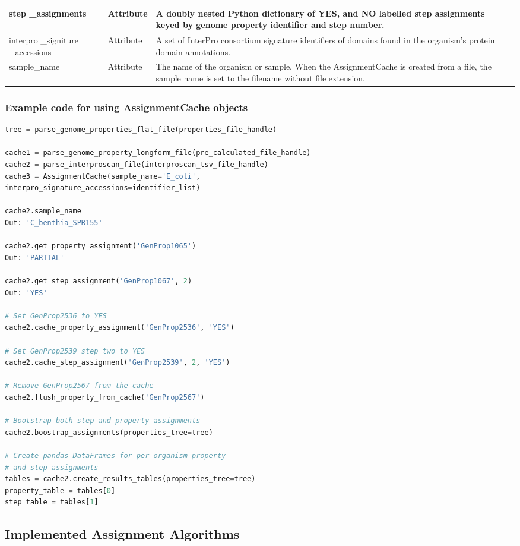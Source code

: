 \begin{longtable}{|p{2.7cm}|p{2cm}|p{10cm}|}
step \_assignments & Attribute & A doubly nested Python dictionary of YES, and NO labelled step assignments keyed by genome property identifier and step number. \\ \hline
interpro \_signiture \_accessions & Attribute & A set of InterPro consortium signature identifiers of domains found in the organism's protein domain annotations. \\ \hline
sample\_name & Attribute & The name of the organism or sample. When the AssignmentCache is created from a file, the sample name is set to the filename without file extension. \\ \hline
\end{longtable}

\subsubsection{Example code for using AssignmentCache  objects}

\begin{lstlisting}[language=Python]
tree = parse_genome_properties_flat_file(properties_file_handle)

cache1 = parse_genome_property_longform_file(pre_calculated_file_handle)
cache2 = parse_interproscan_file(interproscan_tsv_file_handle)
cache3 = AssignmentCache(sample_name='E_coli', 
interpro_signature_accessions=identifier_list)

cache2.sample_name
Out: 'C_benthia_SPR155'

cache2.get_property_assignment('GenProp1065')
Out: 'PARTIAL'

cache2.get_step_assignment('GenProp1067', 2) 
Out: 'YES'

# Set GenProp2536 to YES
cache2.cache_property_assignment('GenProp2536', 'YES')

# Set GenProp2539 step two to YES
cache2.cache_step_assignment('GenProp2539', 2, 'YES')

# Remove GenProp2567 from the cache
cache2.flush_property_from_cache('GenProp2567')

# Bootstrap both step and property assignments
cache2.boostrap_assignments(properties_tree=tree)

# Create pandas DataFrames for per organism property
# and step assignments
tables = cache2.create_results_tables(properties_tree=tree)
property_table = tables[0]
step_table = tables[1]

\end{lstlisting}

\subsection{Implemented Assignment Algorithms} \label{AssignmentCachingAlgorithm}

